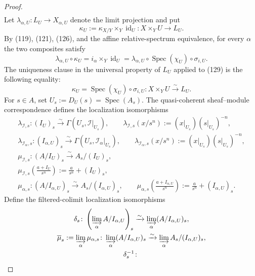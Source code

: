 \begin{proof}
\[\begin{gathered}
  \end{gathered} \tag{128a}
  \]
  Let $\lambda_{\alpha,U}\colon L_U\to X_{\alpha,U}$ denote the limit
  projection and put
  \[
    \kappa_U:=\kappa_{X/Y}\times_Y\operatorname{id}_U\colon
      X\times_YU\longrightarrow L_U.
  \]
  By (119), (121), (126), and the affine relative-spectrum equivalence, for
  every $\alpha$ the two composites satisfy
  \[
    \lambda_{\alpha,U}\circ\kappa_U
      =i_\alpha\times_Y\operatorname{id}_U
      =\lambda_{\alpha,U}\circ\operatorname{Spec}(\chi_U)
         \circ\sigma_{i,U}.                                    \tag{129}
  \]
  The uniqueness clause in the universal property of $L_U$ applied to
  (129) is the following equality:
  \[
    \kappa_U=\operatorname{Spec}(\chi_U)\circ\sigma_{i,U}
      \colon X\times_YU\xrightarrow{\sim}L_U.                  \tag{130}
  \]
  For $s\in A$, set $U_s:=D_U(s)=\operatorname{Spec}(A_s)$.  The
  quasi-coherent sheaf--module correspondence defines the localization
  isomorphisms
  \[
  \begin{gathered}
    \lambda_{\mathcal I,s}\colon (I_U)_s\xrightarrow{\sim}
      \Gamma(U_s,\mathcal I|_{U_s}),\qquad
    \lambda_{\mathcal I,s}(x/s^n)
      :=(x|_{U_s})(s|_{U_s})^{-n},\\
    \lambda_{\mathcal I_\alpha,s}\colon
      (I_{\alpha,U})_s\xrightarrow{\sim}
      \Gamma(U_s,\mathcal I_\alpha|_{U_s}),\qquad
    \lambda_{\mathcal I_\alpha,s}(x/s^n)
      :=(x|_{U_s})(s|_{U_s})^{-n},\\
    \mu_{\mathcal I,s}\colon
      (A/I_U)_s\xrightarrow{\sim}A_s/(I_U)_s,\\
    \mu_{\mathcal I,s}\!\left(\frac{a+I_U}{s^n}\right)
      :=\frac a{s^n}+(I_U)_s,\\
    \mu_{\alpha,s}\colon
      (A/I_{\alpha,U})_s\xrightarrow{\sim}
        A_s/(I_{\alpha,U})_s,\qquad
    \mu_{\alpha,s}\!\left(\frac{a+I_{\alpha,U}}{s^n}\right)
      :=\frac a{s^n}+(I_{\alpha,U})_s.
  \end{gathered} \tag{131}
  \]
  Define the filtered-colimit localization isomorphisms
  \[
  \begin{gathered}
    \delta_s\colon
      \left(\varinjlim_\alpha A/I_{\alpha,U}\right)_s
        \xrightarrow{\sim}
      \varinjlim_\alpha(A/I_{\alpha,U})_s,\\
    \overline\mu_s:=
      \varinjlim_\alpha\mu_{\alpha,s}\colon
      \varinjlim_\alpha(A/I_{\alpha,U})_s
        \xrightarrow{\sim}
      \varinjlim_\alpha A_s/(I_{\alpha,U})_s,\\
    \delta_s^{-1}\colon

\end{gathered}\]
\end{proof}
